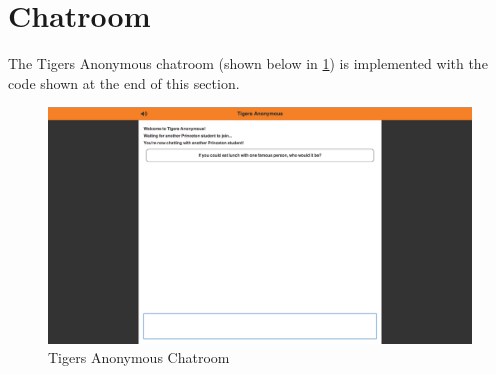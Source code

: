 \lstset{language=HTML}


\section{Chatroom}

The Tigers Anonymous chatroom (shown below in \ref{fig:TAChatRoom}) is implemented with the code shown at the end of this section.

\begin{figure}[h]
\centering
\includegraphics[trim= 35mm 0mm 35mm 0mm, clip, scale=0.25]{./Figures/TAChatroom}
\caption{Tigers Anonymous Chatroom}
\label{fig:TAChatRoom}
\end{figure}

\lstset{language=HTML}

